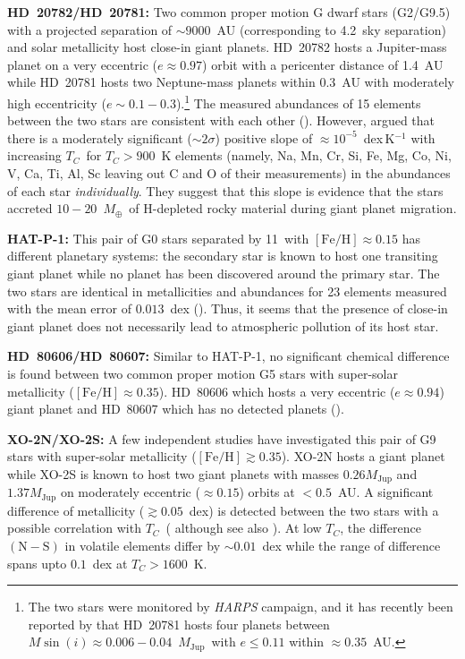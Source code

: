 \documentclass[modern, letterpaper]{aastex61}
\newcommand{\project}[1]{\textsl{#1}}
\newcommand*\elem[1]{\ensuremath{\mathrm{#1}}}
\newcommand*\elemH[1]{\ensuremath{[\mathrm{#1}/\elem{H}]}}
\newcommand*{\feh}{\ensuremath{\elemH{Fe}}}
\newcommand{\Tcondens}{\ensuremath{T_C}}
\newcommand{\mearth}{\ensuremath{M_\oplus}}
\newcommand{\mjupiter}{\ensuremath{M_\mathrm{Jup}}}
\begin{document}
{\bf HD~20782/HD~20781:}
Two common proper motion G dwarf stars (G2/G9.5) with a projected separation of
$\sim9000$~AU (corresponding to 4.2\arcmin\ sky separation) and solar metallicity
host close-in giant planets.
HD~20782 hosts a Jupiter-mass planet on a very eccentric ($e\approx 0.97$)
orbit with a pericenter distance of 1.4~AU while HD~20781 hosts two
Neptune-mass planets within 0.3~AU with moderately high eccentricity
($e\sim0.1-0.3$).\footnote{
  The two stars were monitored by \project{HARPS} campaign, and it has recently
  been reported by \citealt{2017arXiv170505153U} that HD~20781 hosts four
  planets between $M\sin(i)\approx 0.006-0.04$~\mjupiter\ with $e \le 0.11$
  within $\approx 0.35$~AU.}
The measured abundances of 15 elements between the two stars are consistent
with each other (\citealt{Mack:2014aa}).
However, \citealt{Mack:2014aa} argued that there is a moderately significant
($\sim 2\sigma$) positive slope of $\approx 10^{-5}$~dex\,K$^{-1}$ with
increasing \Tcondens\ for $\Tcondens>900$~K elements (namely, Na, Mn, Cr, Si,
Fe, Mg, Co, Ni, V, Ca, Ti, Al, Sc leaving out C and O of their measurements) in
the abundances of each star {\it individually}.
They suggest that this slope is evidence that the stars accreted
$10-20$~\mearth\ of \elem{H}-depleted rocky material during giant planet
migration.

{\bf HAT-P-1:}
This pair of G0 stars separated by 11\arcsec\ with $\feh\approx0.15$ has
different planetary systems:
the secondary star is known to host one transiting giant planet
while no planet has been discovered around the primary star.
The two stars are identical
in metallicities and abundances for 23 elements measured with
the mean error of $0.013$~dex (\citealt{Liu:2014aa}).
Thus, it seems that the presence of close-in giant planet does not necessarily
lead to atmospheric pollution of its host star.

{\bf HD~80606/HD~80607:}
Similar to HAT-P-1, no significant chemical difference is found between two
common proper motion G5 stars with super-solar metallicity ($\feh \approx
0.35$). HD~80606 which hosts a very eccentric ($e\approx0.94$) giant planet and
HD~80607 which has no detected planets (\citealt{Saffe:2015aa,Mack:2016aa}).

{\bf XO-2N/XO-2S:}
A few independent studies have investigated this pair of G9 stars with
super-solar metallicity ($\feh \gtrsim 0.35$).
XO-2N hosts a giant planet while XO-2S is known to host two giant planets with
masses $0.26 \mjupiter$ and $1.37 \mjupiter$ on moderately eccentric ($\approx
0.15$) orbits at $<0.5$~AU.
A significant difference of metallicity ($\gtrsim0.05$~dex) is detected between
the two stars with a possible correlation with \Tcondens\
(\citealt{Ramirez:2015aa,Biazzo:2015aa} although see also
\citealt{Teske:2015aa,Teske:2013aa}).
At low \Tcondens, the difference $(\mathrm{N}-\mathrm{S})$ in volatile elements
differ by $\sim 0.01$~dex while the range of difference spans upto $0.1$~dex at
$\Tcondens>1600$~K.
\end{document}
